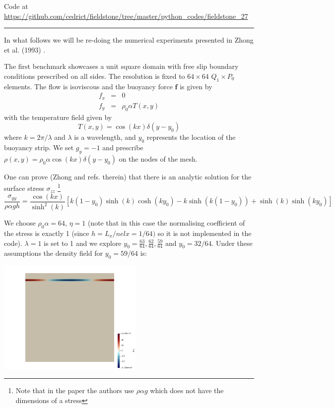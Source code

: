 

\begin{center}
Code at \url{https://github.com/cedrict/fieldstone/tree/master/python_codes/fieldstone_27}
\end{center}

\par\noindent\rule{\textwidth}{0.4pt}


In what follows we will be re-doing the numerical experiments presented in 
Zhong et al. (1993) \cite{zhgh93}.

The first benchmark showcases a unit square domain with free slip 
boundary conditions prescribed on all sides.
The resolution is fixed to $64\times64$ $Q_1 \times P_0$ elements. 
The flow is isoviscous and the buoyancy force ${\bm f}$ is given by 
\begin{eqnarray}
f_x &=& 0 \nonumber\\
f_y &=& \rho_0 \alpha T(x,y) \nonumber
\end{eqnarray}
with the temperature field given by 
\[
T(x,y) = \cos(kx) \delta(y-y_0)
\]
where $k=2\pi/\lambda$ and $\lambda$ is a wavelength, 
and $y_0$ represents the location of the buoyancy strip.
We set $g_y=-1$ and prescribe $\rho(x,y)=\rho_0 \alpha \cos(kx) \delta(y-y_0)$ on the nodes
of the mesh.

One can prove (Zhong \etal \cite{zhgh93} and refs. therein) that 
there is an analytic solution for the surface stress $\sigma_{zz}$
\footnote{Note that in the paper the authors use $\rho \alpha g$ which does not have the 
dimensions of a stress}
\[
\frac{\sigma_{yy}}{\rho \alpha g h} =
\frac{\cos (kx)}{\sinh^2(k)}
\left[
k(1-y_0)\sinh(k) \cosh(ky_0)-k \sinh(k(1-y_0))
+\sinh(k) \sinh(ky_0)
\right]
\]

We choose $\rho_0 \alpha = 64$, $\eta=1$ (note that in this case the 
normalising coefficient of the stress is exactly 1 (since $h=L_x/nelx=1/64)$ so it is not implemented in the code).
$\lambda=1$ is set to 1 and we explore $y_0 = \frac{63}{64},\frac{62}{64},\frac{59}{64}$ and $y_0=32/64$.
Under these assumptions the density field for $y_0=59/64$ is:
\begin{center}
\includegraphics[width=7cm]{python_codes/fieldstone_27/rho}
\end{center}

